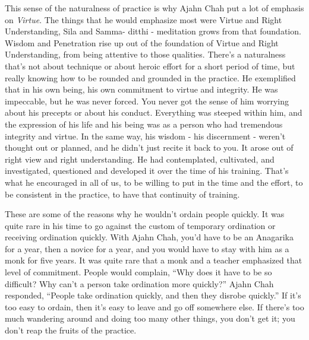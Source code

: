 \documentclass[a4paper,portrait,12pt]{article}
\begin{document}
This  sense  of  the  naturalness  of  practice  is  why {\small
Ajahn  Chah  put  a  lot  of  emphasis  on  }\emph{{\small
Virtue}}{\small .} The  things  that  he  would  emphasize  most  were
Virtue and Right Understanding, Sila and Samma- ditthi  -  meditation
grows  from  that  foundation.  Wisdom  and  Penetration  rise  up
out  of  the foundation  of  Virtue  and  Right  Understanding, from
being  attentive  to  those  qualities. There's  a naturalness
that's  not  about  technique  or  about heroic effort for a short
period of time, but really knowing how to be rounded and grounded in
the practice. He exemplified that in his own being, his own commitment
to virtue and integrity. He was impeccable,  but  he  was  never
forced. You  never got the sense of him worrying about his precepts
or  about  his  conduct.  Everything  was  steeped within him, and the
expression of his life and his being  was  as  a  person  who  had
tremendous integrity and virtue. In the same way, his wisdom -  his
discernment  -  weren't  thought  out  or planned, and he didn't just
recite it back to you.  It arose out of right view and right
understanding.  He      had      contemplated,      cultivated,
and investigated, questioned and developed it over the time of his
training. That's what he encouraged in all of us, to be willing to put
in the time and the effort,  to  be  consistent  in  the  practice,
to  have that continuity of training.  





These  are  some  of  the  reasons  why  he  wouldn't ordain  people
quickly.  It  was  quite  rare  in  his time  to  go  against  the
custom  of  temporary ordination  or  receiving  ordination  quickly.
With Ajahn  Chah,  you'd  have  to  be  an  Anagarika  for  a year,
then a novice for a year, and you would have to stay with him as a
monk for five years. It was quite rare that a monk and a teacher
emphasized that    level    of    commitment.    People    would
complain,  ``Why  does  it  have  to  be  so  difficult?  Why
can't   a   person   take   ordination   more quickly?''  Ajahn  Chah
responded,  ``People  take ordination quickly, and then they disrobe
quickly.'' If  it's  too  easy  to  ordain,  then  it's  easy  to
leave and  go  off  somewhere  else.  If  there's  too  much
wandering  around  and  doing  too  many  other things, you don't get
it; you don't reap the fruits of the practice.  
\end{document}
